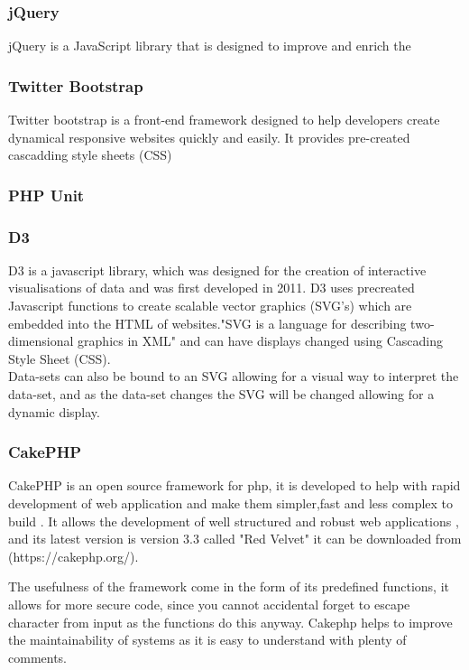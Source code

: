 \documentclass[12pt]{article}  %
\begin{document}
\subsubsection{jQuery}
jQuery is a JavaScript library that is designed to improve and enrich the 

\subsubsection{Twitter Bootstrap}
Twitter bootstrap is a front-end framework \cite{noauthor_bootstrap_nodate} designed to help developers create dynamical responsive websites quickly and easily. It provides pre-created cascadding style sheets (CSS)

\subsubsection{PHP Unit}


\subsubsection{D3}
D3 \cite{bostock_d3.js_nodate} is a javascript library, which was designed for the creation of interactive visualisations of data and was first developed in 2011. D3 uses precreated Javascript functions to create scalable vector graphics (SVG's) which are embedded into the HTML of websites."SVG is a language for describing two-dimensional graphics in XML"\cite{ferraiolo_scalable_2000} and can have displays changed  using Cascading Style Sheet (CSS).  \\
Data-sets can also be bound to an SVG allowing for a visual way to interpret the data-set, and as the data-set changes the SVG will be changed allowing for a dynamic display.

\subsubsection{CakePHP}
CakePHP is an open source framework for php, it is developed to help with rapid development of web application and make them simpler,fast and less complex to build \cite{noauthor_cakephp_nodate}. It allows the development of well structured and robust web applications \cite{plekhanova_evaluating_2009}, and its latest version is version 3.3 called "Red Velvet" it can be downloaded from (https://cakephp.org/).

The usefulness of the framework come in the form of its predefined functions, it allows for more secure code, since you cannot accidental forget to escape character from input as the functions do this anyway. Cakephp helps to improve the maintainability of systems as it is easy to understand with plenty of comments.
\end{document}
